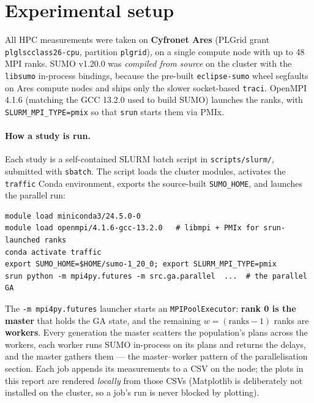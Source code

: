\documentclass[11pt,a4paper]{article}
\begin{document}
\section{Experimental setup}
All HPC measurements were taken on \textbf{Cyfronet Ares} (PLGrid grant
\texttt{plglscclass26-cpu}, partition \texttt{plgrid}), on a single compute node
with up to 48 MPI ranks. SUMO v1.20.0 was \emph{compiled from source} on the
cluster with the \texttt{libsumo} in-process bindings, because the pre-built
\texttt{eclipse-sumo} wheel segfaults on Ares compute nodes and ships only the
slower socket-based \texttt{traci}. OpenMPI 4.1.6 (matching the GCC 13.2.0 used
to build SUMO) launches the ranks, with \texttt{SLURM\_MPI\_TYPE=pmix} so that
\texttt{srun} starts them via PMIx.

\paragraph{How a study is run.} Each study is a self-contained SLURM batch
script in \texttt{scripts/slurm/}, submitted with \texttt{sbatch}. The script
loads the cluster modules, activates the \texttt{traffic} Conda environment,
exports the source-built \texttt{SUMO\_HOME}, and launches the parallel run:
\begin{verbatim}
module load miniconda3/24.5.0-0
module load openmpi/4.1.6-gcc-13.2.0   # libmpi + PMIx for srun-launched ranks
conda activate traffic
export SUMO_HOME=$HOME/sumo-1_20_0; export SLURM_MPI_TYPE=pmix
srun python -m mpi4py.futures -m src.ga.parallel  ...  # the parallel GA
\end{verbatim}
The \texttt{-m mpi4py.futures} launcher starts an \texttt{MPIPoolExecutor}:
\textbf{rank 0 is the master} that holds the GA state, and the remaining
$w = (\text{ranks}-1)$ ranks are \textbf{workers}. Every generation the master
scatters the population's plans across the workers, each worker runs SUMO
in-process on its plans and returns the delays, and the master gathers them ---
the master--worker pattern of the parallelisation section. Each job appends its
measurements to a CSV on the node; the plots in this report are rendered
\emph{locally} from those CSVs (Matplotlib is deliberately not installed on the
cluster, so a job's run is never blocked by plotting).
\end{document}
